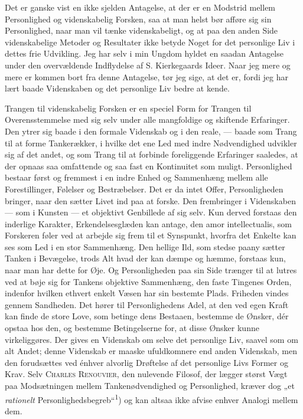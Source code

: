 \documentclass[12pt,a4paper,openany]{book}
\newcommand{\opage}[1]{\marginnote{\footnotesize\textit{[#1]}}}
\begin{document}
Det er ganske vist en ikke sjelden Antagelse, at der er en Modstrid mellem
Personlighed og videnskabelig Forsken, saa at man helst bør afføre sig sin
Personlighed, naar man vil tænke videnskabeligt, og at paa den anden Side
videnskabelige Metoder og Resultater ikke betyde Noget for det personlige Liv i
dettes frie Udvikling. Jeg har selv i min Ungdom hyldet en saadan Antagelse
under den overvældende Indflydelse af S. Kierkegaards
\opage{2}Ideer. Naar jeg mere og mere er kommen bort fra denne Antagelse, tør
jeg sige, at det er, fordi jeg har lært baade Videnskaben og det personlige Liv
bedre at kende.

Trangen til videnskabelig Forsken er en speciel Form for Trangen til
Overensstemmelse med sig selv under alle mangfoldige og skiftende Erfaringer.
Den ytrer sig baade i den formale Videnskab og i den reale, --- baade som Trang
til at forme Tankerækker, i hvilke det ene Led med indre Nødvendighed udvikler
sig af det andet, og som Trang til at forbinde foreliggende Erfaringer
saaledes, at der opnaas saa omfattende og saa fast en Kontinuitet som muligt.
Personlighed bestaar først og fremmest i en indre Enhed og Sammenhæng mellem
alle Forestillinger, Følelser og Bestræbelser. Det er da intet Offer,
Personligheden bringer, naar den sætter Livet ind paa at forske. Den
frembringer i Videnskaben --- som i Kunsten --- et objektivt Genbillede af sig
selv. Kun derved forstaas den inderlige Karakter, Erkendelsesglæden kan antage,
den amor intellectualis, som Forskeren føler ved at arbejde sig frem til et
Synspunkt, hvorfra det Enkelte kan ses som Led i en stor Sammenhæng. Den
hellige Ild, som stedse paany sætter Tanken i Bevægelse, trods Alt hvad der kan
dæmpe og hæmme, forstaas kun, naar man har dette for Øje. Og Personligheden paa
sin Side trænger til at lutres ved at bøje sig for Tankens objektive
Sammenhæng, den faste Tingenes Orden, indenfor hvilken ethvert enkelt Væsen har
sin bestemte Plads. Friheden vindes gennem Sandheden. Det hører til
Personlighedens Adel, at den ved egen Kraft kan finde de store Love, som
betinge dens Bestaaen, bestemme de Ønsker, dér opstaa hos den, og bestemme
Betingelserne for, at disse Ønsker kunne virkeliggøres. Der gives en Videnskab
om selve det personlige Liv, saavel som om alt Andet; denne Videnskab er maaske
ufuldkomnere end anden Videnskab, men den forudsættes ved énhver alvorlig
Drøftelse af det personlige Livs Former og Krav. Selv \textsc{Charles
Renouvier,} den nulevende Filosof, der lægger størst Vægt paa Modsætningen
mellem Tankenødvendighed og Personlighed, kræver dog „et \textit{rationelt}
Personlighedsbegreb“\textsuperscript{1}) og kan altsaa ikke afvise enhver
Analogi mellem dem.
\end{document}

